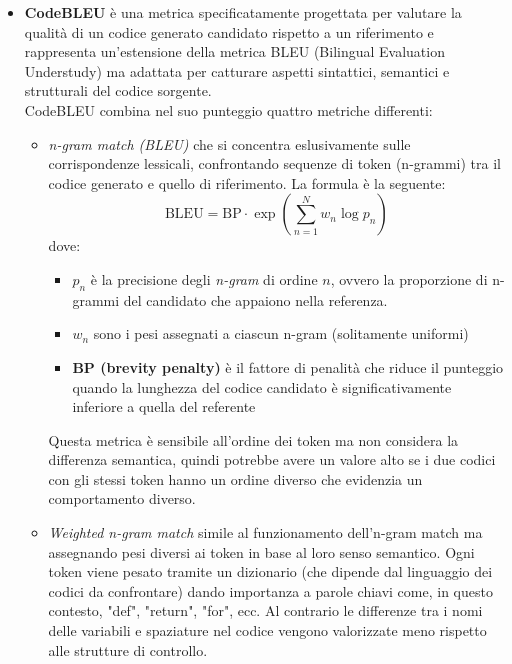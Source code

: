 \documentclass{article}
\begin{document}
\begin{itemize}
    \item \textbf{CodeBLEU} \cite{ren2020codebleumethodautomaticevaluation} è una metrica specificatamente progettata per valutare la qualità di un codice generato candidato rispetto a un riferimento e rappresenta un'estensione della metrica BLEU (Bilingual Evaluation Understudy) \cite{10.3115/1073083.1073135} ma adattata per catturare aspetti sintattici, semantici e strutturali del codice sorgente.\\
    CodeBLEU combina nel suo punteggio quattro metriche differenti:
    \begin{itemize}
        \item \textit{n-gram match (BLEU)} che si concentra eslusivamente sulle corrispondenze lessicali, confrontando sequenze di token (n-grammi) tra il codice generato e quello di riferimento. La formula è la seguente:
        \begin{equation}
             \text{BLEU} = \text{BP} \cdot \exp \left( \sum_{n=1}^{N} w_n \log p_n \right)
        \end{equation}
        dove:
        \begin{itemize}
            \item $p_n$ è la precisione degli \textit{n-gram} di ordine $n$, ovvero la proporzione di n-grammi del candidato che appaiono nella referenza.
            \item $w_n$ sono i pesi assegnati a ciascun n-gram (solitamente uniformi)
            \item \textbf{BP (brevity penalty)} è il fattore di penalità che riduce il punteggio quando la lunghezza del codice candidato è significativamente inferiore a quella del referente
        \end{itemize}
        Questa metrica è sensibile all'ordine dei token ma non considera la differenza semantica, quindi potrebbe avere un valore alto se i due codici con gli stessi token hanno un ordine diverso che evidenzia un comportamento diverso.

        \item \textit{Weighted n-gram match} simile al funzionamento dell'n-gram match ma assegnando pesi diversi ai token in base al loro senso semantico. Ogni token viene pesato tramite un dizionario (che dipende dal linguaggio dei codici da confrontare) dando importanza a parole chiavi come, in questo contesto, "def", "return", "for", ecc.
        Al contrario le differenze tra i nomi delle variabili e spaziature nel codice vengono valorizzate meno rispetto alle strutture di controllo.


\end{itemize}
\end{itemize}
\end{document}
